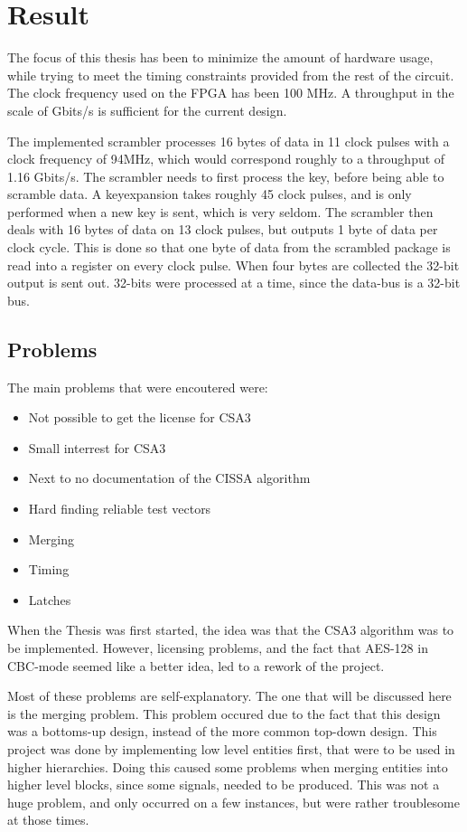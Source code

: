 \chapter{Result}
The focus of this thesis has been to minimize the amount of hardware 
usage, while trying to meet the timing constraints provided 
from the rest of the circuit. The clock frequency used on the FPGA has 
been 100 MHz. A throughput in the scale of Gbits/s is sufficient for the
current design.

The implemented scrambler processes 16 bytes of data in 11 clock pulses 
with a clock frequency of 94MHz, which would correspond 
roughly to a throughput of 1.16 Gbits/s. The scrambler needs to first
process the key, before being able to scramble data. A keyexpansion 
takes roughly 45 clock pulses, and is only performed when a new key is 
sent, which is very seldom. The scrambler then deals with 16 bytes of 
data on 13 clock pulses, but outputs 1 byte of data per clock cycle. 
This is done so that one byte of data from the scrambled package is 
read into a register on every clock pulse. When four bytes are collected
the 32-bit output is sent out. 32-bits were processed at a time, since 
the data-bus is a 32-bit bus.

\section{Problems}
The main problems that were encoutered were:

\begin{itemize}
\item Not possible to get the license for CSA3
\item Small interrest for CSA3
\item Next to no documentation of the CISSA algorithm
\item Hard finding reliable test vectors
\item Merging
\item Timing
\item Latches
\end{itemize}

When the Thesis was first started, the idea was that the CSA3 algorithm 
was to be implemented. However, licensing problems, and the 
fact that AES-128 in CBC-mode seemed like a better idea, led to a 
rework of the project.

Most of these problems are self-explanatory. The one that 
will be discussed here is the merging problem. This problem occured 
due to the fact that this design was a bottoms-up design, instead of 
the more common top-down design. This project was done by implementing 
low level entities first, that were to be used in higher hierarchies. 
Doing this caused some problems when merging entities into higher level 
blocks, since some signals, needed to be produced. This was not a huge 
problem, and only occurred on a few instances, but were rather 
troublesome at those times.

